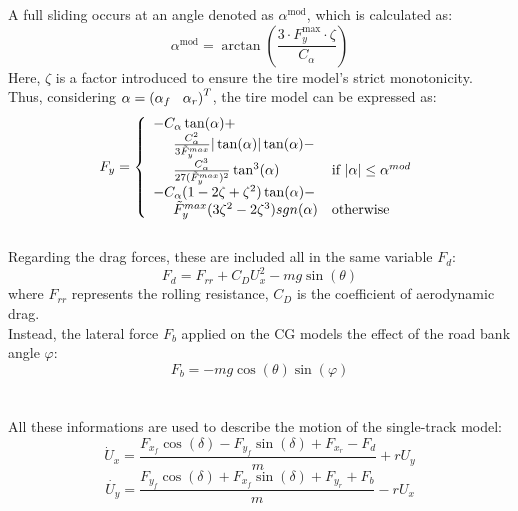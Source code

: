 \documentclass[a4paper, onecolumn, 12pt]{article}
\newcommand\tab[1][.3cm]{\hspace*{#1}}
\newcommand\tabeq[1][.5cm]{\hspace*{#1}}
\begin{document}
A full sliding occurs at an angle denoted as $\alpha^{\text{mod}}$, which is calculated as:
\begin{equation}
    \alpha^{\text{mod}} = \arctan\left(\frac{3\cdot F_y^{\text{max}}\cdot\zeta}{C_{\alpha}}\right)
\end{equation}
Here, $\zeta$ is a factor introduced to ensure the tire model's strict monotonicity.\\
Thus, considering $\alpha = \left(\alpha_f \tab \alpha_r\right)^T$, the tire model can
be expressed as:
\begin{equation}
    F_y = 
    \left\{
	\begin{array}{ll}
		-C_\alpha \tan(\alpha)+&\\
        \tabeq\frac{C_\alpha^2}{3\tilde{F}_y^{max}}|\tan(\alpha)|\tan(\alpha) - &\\
        \tabeq\frac{C_\alpha^3}{27(\tilde{F}_{y}^{max})^2}\tan^3(\alpha) 
        & \mbox{if } |\alpha| \leq \alpha^{mod} \\
		-C_{\alpha}(1-2\zeta+\zeta^2)\tan(\alpha)-&\\
        \tabeq \tilde{F}_y^{max}(3\zeta^2-2\zeta^3){sgn(\alpha)}
        & \mbox{otherwise }
	\end{array}
    \right.
\end{equation}
\\
Regarding the drag forces, these are included all in the same variable $F_d$:
\begin{equation}
    \label{drag_force}
    F_d = F_{rr}+C_DU_x^2-mg\sin(\theta)
\end{equation}
where $F_{rr}$ represents the rolling resistance, $C_D$ is the coefficient of aerodynamic
drag. \\
Instead, the lateral force $F_b$ applied on the CG models the effect of the road bank angle $\varphi$:
\begin{equation}
    \label{lateral_force}
    F_b = -mg\cos(\theta)\sin(\varphi)
\end{equation}
\\
\\
All these informations are used to describe the motion of the single-track model:
\begin{equation}
    \dot{U}_x = \frac{F_{x_f}\cos(\delta)-F_{y_f}\sin(\delta)+F_{x_r}-F_d}{m}+rU_y
\end{equation}
\begin{equation}
    \dot{U_y} = \frac{F_{y_f}\cos(\delta)+F_{x_f}\sin(\delta)+F_{y_r}+F_b}{m}-rU_x 
\end{equation}
\end{document}
